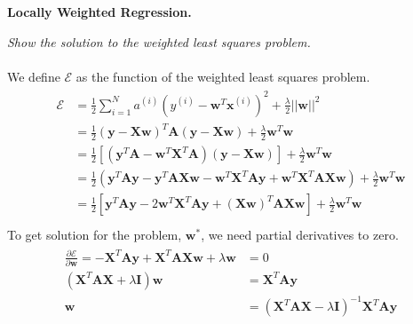 \documentclass{myhw}
\begin{document}
\begin{homeworkProblem}
\textbf{Locally Weighted Regression.}
\begin{homeworkSection}
\emph{Show the solution to the weighted least squares problem. }\\
\\
We define $\mathscr{E}$ as the function of the weighted least squares problem.
\begin{gather*}
\begin{aligned}
\mathscr{E} & = \frac{1}{2} \sum_{i=1}^N{a^{(i)} (y^{(i)} - \textbf{w}^T \textbf{x}^{(i)})^2} + \frac{\lambda}{2} ||\textbf{w}||^2 \\
& = \frac{1}{2} (\textbf{y} - \textbf{Xw})^T \textbf{A} (\textbf{y} - \textbf{Xw}) + \frac{\lambda}{2} \textbf{w}^T \textbf{w} \\
& = \frac{1}{2} [(\textbf{y}^T \textbf{A} - \textbf{w}^T \textbf{X}^T \textbf{A})(\textbf{y} - \textbf{Xw})] + \frac{\lambda}{2} \textbf{w}^T \textbf{w} \\
& = \frac{1}{2} (\textbf{y}^T \textbf{A} \textbf{y} - \textbf{y}^T \textbf{AXw} - \textbf{w}^T \textbf{X}^T \textbf{Ay} + \textbf{w}^T \textbf{X}^T \textbf{AXw}) + \frac{\lambda}{2} \textbf{w}^T \textbf{w} \\
& = \frac{1}{2} [\textbf{y}^T \textbf{A} \textbf{y} - 2 \textbf{w}^T \textbf{X}^T \textbf{Ay} + (\textbf{Xw})^T \textbf{AXw}] + \frac{\lambda}{2} \textbf{w}^T \textbf{w} \\
\end{aligned}
\end{gather*}
To get solution for the problem, $\textbf{w}^*$, we need partial derivatives to zero.
\begin{gather*}
\begin{aligned}
\frac{\partial \mathscr{E}}{\partial \textbf{w}} = -\textbf{X}^T \textbf{Ay} + \textbf{X}^T \textbf{AXw} + \lambda \textbf{w} & = 0 \\
(\textbf{X}^T \textbf{AX} + \lambda \textbf{I}) \textbf{w} & = \textbf{X}^T \textbf{Ay} \\
\textbf{w} & = (\textbf{X}^T \textbf{AX} - \lambda \textbf{I})^{-1} \textbf{X}^T \textbf{Ay}
\end{aligned}
\end{gather*}

\end{homeworkSection}
\end{homeworkProblem}
\end{document}
